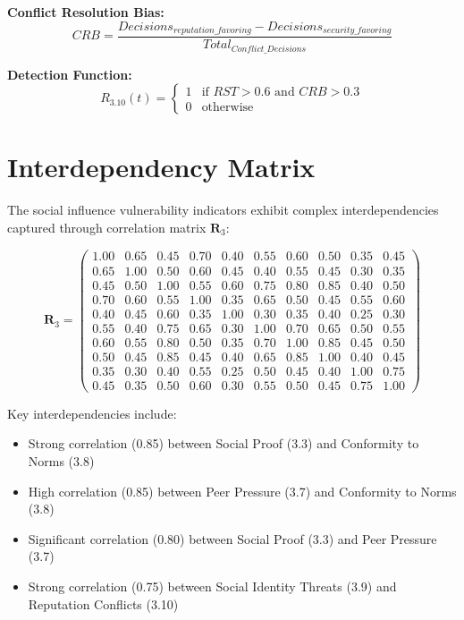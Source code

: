 \documentclass[11pt,a4paper]{article}
\begin{document}
\textbf{Conflict Resolution Bias:}
\begin{equation}
CRB = \frac{Decisions_{reputation\_favoring} - Decisions_{security\_favoring}}{Total_{Conflict\_Decisions}}
\end{equation}

\textbf{Detection Function:}
\begin{equation}
R_{3.10}(t) = \begin{cases}
1 & \text{if } RST > 0.6 \text{ and } CRB > 0.3 \\
0 & \text{otherwise}
\end{cases}
\end{equation}

\section{Interdependency Matrix}

The social influence vulnerability indicators exhibit complex interdependencies captured through correlation matrix $\mathbf{R}_{3}$:

\begin{equation}
\mathbf{R}_3 = \begin{pmatrix}
1.00 & 0.65 & 0.45 & 0.70 & 0.40 & 0.55 & 0.60 & 0.50 & 0.35 & 0.45 \\
0.65 & 1.00 & 0.50 & 0.60 & 0.45 & 0.40 & 0.55 & 0.45 & 0.30 & 0.35 \\
0.45 & 0.50 & 1.00 & 0.55 & 0.60 & 0.75 & 0.80 & 0.85 & 0.40 & 0.50 \\
0.70 & 0.60 & 0.55 & 1.00 & 0.35 & 0.65 & 0.50 & 0.45 & 0.55 & 0.60 \\
0.40 & 0.45 & 0.60 & 0.35 & 1.00 & 0.30 & 0.35 & 0.40 & 0.25 & 0.30 \\
0.55 & 0.40 & 0.75 & 0.65 & 0.30 & 1.00 & 0.70 & 0.65 & 0.50 & 0.55 \\
0.60 & 0.55 & 0.80 & 0.50 & 0.35 & 0.70 & 1.00 & 0.85 & 0.45 & 0.50 \\
0.50 & 0.45 & 0.85 & 0.45 & 0.40 & 0.65 & 0.85 & 1.00 & 0.40 & 0.45 \\
0.35 & 0.30 & 0.40 & 0.55 & 0.25 & 0.50 & 0.45 & 0.40 & 1.00 & 0.75 \\
0.45 & 0.35 & 0.50 & 0.60 & 0.30 & 0.55 & 0.50 & 0.45 & 0.75 & 1.00
\end{pmatrix}
\end{equation}

Key interdependencies include:
\begin{itemize}
\item Strong correlation (0.85) between Social Proof (3.3) and Conformity to Norms (3.8)
\item High correlation (0.85) between Peer Pressure (3.7) and Conformity to Norms (3.8)
\item Significant correlation (0.80) between Social Proof (3.3) and Peer Pressure (3.7)
\item Strong correlation (0.75) between Social Identity Threats (3.9) and Reputation Conflicts (3.10)
\end{itemize}
\end{document}
